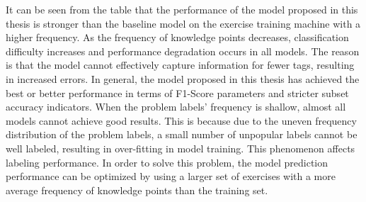 
It can be seen from the table that the performance of the model proposed in this thesis is stronger than the baseline model on the exercise training machine with a higher frequency. As the frequency of knowledge points decreases, classification difficulty increases and performance degradation occurs in all models. The reason is that the model cannot effectively capture information for fewer tags, resulting in increased errors. In general, the model proposed in this thesis has achieved the best or better performance in terms of F1-Score parameters and stricter subset accuracy indicators. When the problem labels' frequency is shallow, almost all models cannot achieve good results. This is because due to the uneven frequency distribution of the problem labels, a small number of unpopular labels cannot be well labeled, resulting in over-fitting in model training. This phenomenon affects labeling performance. In order to solve this problem, the model prediction performance can be optimized by using a larger set of exercises with a more average frequency of knowledge points than the training set.

